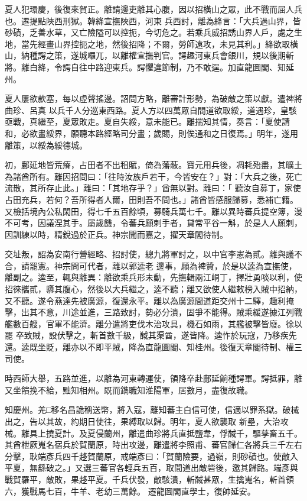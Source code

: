 \begin{pinyinscope}
 夏人犯環慶，後復來賀正。離請邊吏離其心腹，因以招橫山之眾，此不戰而屈人兵也。遷提點陜西刑獄。韓絳宣撫陜西，河東
 兵西討，離為絳言：「大兵過山界，皆砂磧，乏善水草，又亡險隘可以控扼，今切危之。若乘兵威招誘山界人戶，處之生地，當先經畫山界控扼之地，然後招降；不爾，勞師遠攻，未見其利。」絳欲取橫山，納種諤之策，遂城囉兀，以離權宣撫判官。諤趣河東兵會銀川，規以後期斬將。離白絳，令諤自往中路迎東兵。諤懼違節制，乃不敢逞。加直龍圖閣、知延州。



 夏人屢欲款塞，每以虛聲搖邊。詔問方略，離審計形勢，為破敵之策以獻。遣裨將曲珍、呂真
 以兵千人分巡東西路。夏人方以四萬眾自間道欲取綏，道遇珍，皇駭亟戰，真繼至，夏眾敗走。夏自失綏，意未能已。離揣知其情，奏言：「夏使請和，必欲畫綏界，願聽本路經略司分畫；歲賜，則俟通和之日復焉。」明年，遂用離策，以綏為綏德城。



 初，鄜延地皆荒瘠，占田者不出租賦，倚為藩蔽。寶元用兵後，凋耗殆盡，其曠土為諸酋所有。離因招問曰：「往時汝族戶若干，今皆安在？」對：「大兵之後，死亡流散，其所存止此。」離曰：「其地存乎？」酋無以對。離曰：「
 聽汝自募丁，家使占田充兵，若何？吾所得者人爾，田則吾不問也。」諸酋皆感服歸募，悉補亡籍。又檢括境內公私閑田，得七千五百餘頃，募騎兵萬七千。離以異時蕃兵提空簿，漫不可考，因議涅其手。屬歲饑，令蕃兵願刺手者，貸常平谷一斛，於是人人願刺，因訓練以時，精銳過於正兵。神宗聞而嘉之，擢天章閣待制。



 交址叛，詔為安南行營經略、招討使，總九將軍討之，以中官李憲為貳。離與議不合，請罷憲。神宗問可代者，離以郭逵老
 邊事，願為裨贊，於是以逵為宣撫使，離副之。逵至，輒與離異：離欲乘兵形未動，先撫輯兩江峒丁，擇壯勇啖以利，使招徠攜貳，隳其腹心，然後以大兵繼之，逵不聽；離又欲使人繼敕榜入賊中招納，又不聽。遂令燕達先被廣源，復還永平。離以為廣源間道距交州十二驛，趣利掩擊，出其不意，川途並進，三路致討，勢必分潰，固爭不能得。賊乘緩遂據江列戰艦數百艘，官軍不能濟。離分遣將吏伐木治攻具，機石如雨，其艦被擊皆廢。徐以罷
 卒致賊，設伏擊之，斬首數千級，馘其渠酋，遂皆降。逵怍於玩寇，乃移疾先還。逵既坐貶，離亦以不即平賊，降為直龍圖閣、知桂州。後復天章閣待制、權三司使。



 時西師大舉，五路並進，以離為河東轉運使，領降卒赴鄜延餉種諤軍。諤抵罪，離又坐饋挽不給，黜知相州。既而鐫職知淮陽軍，居數月，盡復故職。



 知慶州。羌□移名昌詭稱送幣，將入寇，離知蕃主白信可使，信適以罪系獄。破械出之，告以其故，約期日使往，果縛取以歸。明年，夏人欲襲取
 新壘，大治攻械。離具上撓夏計。及夏侵蘭州，離遣曲珍將兵直抵鹽韋，俘馘千，驅孳畜五千。其酋枻厥嵬名宿兵於賀蘭原，時出攻邊，離遣將李照甫、蕃官歸仁各將兵三千左右分擊，耿端彥兵四千趍賀蘭原，戒端彥曰：「賀蘭險要，過嶺，則砂磧也。使敵入平夏，無繇破之。」又選三蕃官各輕兵五百，取間道出敵砦後，邀其歸路。端彥與戰賀羅平，敵敗，果趍平夏。千兵伏發，敵駭潰，斬馘甚眾，生擒嵬名，斬首領六，獲戰馬七百，牛羊、老幼三萬餘。
 遷龍圖閣直學士，復帥延安。




\end{pinyinscope}
